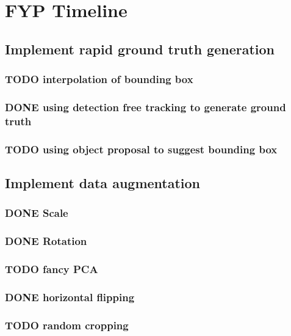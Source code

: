 \documentclass[11pt]{article}
\author{batumon}
\date{\today}
\title{}
\begin{document}
\tableofcontents

\section{FYP Timeline}
\label{sec:org96a25df}
\subsection{Implement rapid ground truth generation}
\label{sec:orgdd1e9c7}
\subsubsection{{\bfseries\sffamily TODO} interpolation of bounding box}
\label{sec:orgd2ffe9c}
\subsubsection{{\bfseries\sffamily DONE} using detection free tracking to generate ground truth}
\label{sec:org412cdad}
\subsubsection{{\bfseries\sffamily TODO} using object proposal to suggest bounding box}
\label{sec:org861e916}
\subsection{Implement data augmentation}
\label{sec:org7180648}
\subsubsection{{\bfseries\sffamily DONE} Scale}
\label{sec:org2028ef1}
\subsubsection{{\bfseries\sffamily DONE} Rotation}
\label{sec:orgc87f01d}
\subsubsection{{\bfseries\sffamily TODO} fancy PCA}
\label{sec:org0137a29}
\subsubsection{{\bfseries\sffamily DONE} horizontal flipping}
\label{sec:org6184c84}
\subsubsection{{\bfseries\sffamily TODO} random cropping}
\label{sec:orge43d2af}
\end{document}
